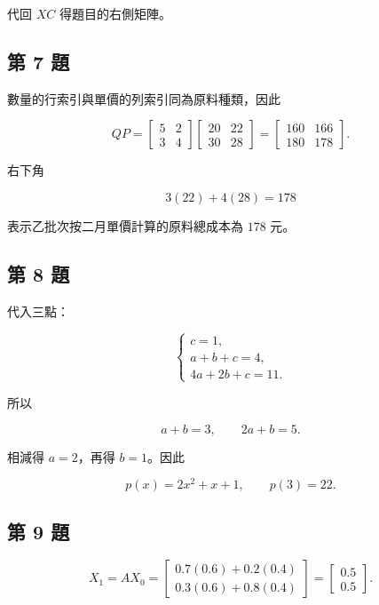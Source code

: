 \documentclass[11pt,a4paper]{article}
\begin{document}
代回 \(XC\) 得題目的右側矩陣。

\subsection{第 7 題}\label{ux7b2c-7-ux984c}

數量的行索引與單價的列索引同為原料種類，因此

\[
QP=
\begin{bmatrix}5&2\\3&4\end{bmatrix}
\begin{bmatrix}20&22\\30&28\end{bmatrix}
=
\boxed{\begin{bmatrix}160&166\\180&178\end{bmatrix}}.
\]

右下角

\[
3(22)+4(28)=178
\]

表示乙批次按二月單價計算的原料總成本為 \(\boxed{178}\) 元。

\subsection{第 8 題}\label{ux7b2c-8-ux984c}

代入三點：

\[
\begin{cases}
c=1,\\
a+b+c=4,\\
4a+2b+c=11.
\end{cases}
\]

所以

\[
a+b=3,\qquad 2a+b=5.
\]

相減得 \(a=2\)，再得 \(b=1\)。因此

\[
\boxed{p(x)=2x^2+x+1},
\qquad
\boxed{p(3)=22}.
\]

\subsection{第 9 題}\label{ux7b2c-9-ux984c}

\[
X_1=AX_0
=
\begin{bmatrix}
0.7(0.6)+0.2(0.4)\\
0.3(0.6)+0.8(0.4)
\end{bmatrix}
=
\boxed{\begin{bmatrix}0.5\\0.5\end{bmatrix}}.
\]
\end{document}
